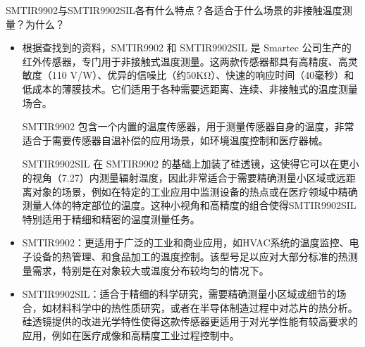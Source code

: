 \documentclass[dvipsnames, svgnames,a4paper,11pt]{article}
\begin{document}
	\begin{question}
		SMTIR9902与SMTIR9902SIL各有什么特点？各适合于什么场景的非接触温度测量？为什么？
	\end{question}
	\begin{itemize}
		\item 根据查找到的资料，SMTIR9902 和 SMTIR9902SIL 是 Smartec 公司生产的红外传感器，专门用于非接触式温度测量。这两款传感器都具有高精度、高灵敏度（110 V/W）、优异的信噪比（约50KΩ）、快速的响应时间（40毫秒）和低成本的薄膜技术。它们适用于各种需要远距离、连续、非接触式的温度测量场合。
		
		SMTIR9902 包含一个内置的温度传感器，用于测量传感器自身的温度，非常适合于需要传感器自温补偿的应用场景，如环境温度控制和医疗器械。
		
		SMTIR9902SIL 在 SMTIR9902 的基础上加装了硅透镜，这使得它可以在更小的视角（7.27\degree）内测量辐射温度，因此非常适合于需要精确测量小区域或远距离对象的场景，例如在特定的工业应用中监测设备的热点或在医疗领域中精确测量人体的特定部位的温度。这种小视角和高精度的组合使得SMTIR9902SIL特别适用于精细和精密的温度测量任务。
		
		\item SMTIR9902：更适用于广泛的工业和商业应用，如HVAC系统的温度监控、电子设备的热管理、和食品加工的温度控制。该型号足以应对大部分标准的热测量需求，特别是在对象较大或温度分布较均匀的情况下。
		
		\item SMTIR9902SIL：适合于精细的科学研究，需要精确测量小区域或细节的场合，如材料科学中的热性质研究，或者在半导体制造过程中对芯片的热分析。 硅透镜提供的改进光学特性使得这款传感器更适用于对光学性能有较高要求的应用，例如在医疗成像和高精度工业过程控制中。
	\end{itemize}
	
\end{document}
